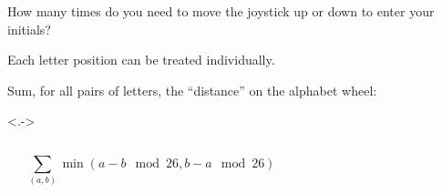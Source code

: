 \begin{frame}
    \frametitle{\problemtitle}
    \begin{description}
        \item<+->[Problem:] How many times do you need to move the joystick up or down to enter your initials?
        \item<+->[Observation:] Each letter position can be treated individually.
        \item<+->[Solution:] Sum, for all pairs of letters, the ``distance'' on the alphabet wheel:
    \end{description}

    \uncover<.->{
        \begin{columns}
            \hfill
            \begin{center}
            \end{center}

            \[ \sum_{(a,b)} \min(a - b \mod 26, b - a \mod 26) \]
        \end{columns}
    }
    \solvestats
\end{frame}
